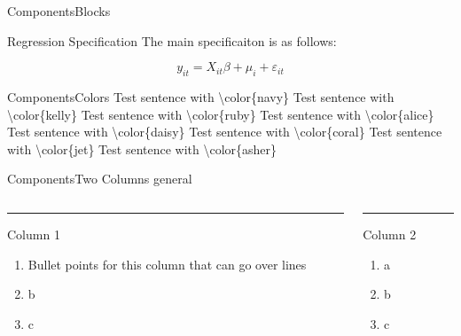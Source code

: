 \documentclass[aspectratio=43]{beamer}
\begin{document}
\begin{frame}{Components}{Blocks}
    \begin{block}{Regression Specification}
        The main specificaiton is as follows: 

        \[
            y_{it} = X_{it} \beta + \mu_i + \varepsilon_{it}
        \]
    \end{block}
\end{frame}

\begin{frame}{Components}{Colors}
    {\color{navy} Test sentence with \textbackslash color\{navy\}}\newline
    {\color{kelly} Test sentence with \textbackslash color\{kelly\}}\newline
    {\color{ruby} Test sentence with \textbackslash color\{ruby\}}\newline
    {\color{alice} Test sentence with \textbackslash color\{alice\}}\newline
    {\color{daisy} Test sentence with \textbackslash color\{daisy\}}\newline
    {\color{coral} Test sentence with \textbackslash color\{coral\}}\newline
    {\color{jet} Test sentence with \textbackslash color\{jet\}}\newline
    {\color{asher} Test sentence with \textbackslash color\{asher\}}\newline
\end{frame}

\begin{frame}{Components}{Two Columns general}
    \begin{columns}[T] %
    \begin{column}{.50\textwidth}
        {\color{accent}\rule{\linewidth}{2pt}}
        Column 1

        \begin{enumerate}
            \item Bullet points for this column that can go over lines
            \item b
            \item c
        \end{enumerate}
    \end{column}
    
    \hfill
    
    \begin{column}{.50\textwidth}
        {\color{accent}\rule{\linewidth}{2pt}}
        Column 2

        \begin{enumerate}
            \item a
            \item b
            \item c
        \end{enumerate}
    \end{column}
    \end{columns}
\end{frame}
\end{document}
